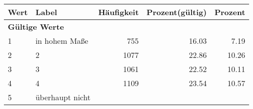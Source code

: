      \begin{longtable}{lXrrr}
     \toprule
     \textbf{Wert} & \textbf{Label} & \textbf{Häufigkeit} & \textbf{Prozent(gültig)} & \textbf{Prozent} \\
     \endhead
     \midrule
     \multicolumn{5}{l}{\textbf{Gültige Werte}}\\

     1 &
     \multicolumn{1}{X}{ in hohem Maße   } &


       \num{755} &
       \num[round-mode=places,round-precision=2]{16,03} &
         \num[round-mode=places,round-precision=2]{7,19} \\

     2 &
     \multicolumn{1}{X}{ 2   } &


       \num{1077} &
       \num[round-mode=places,round-precision=2]{22,86} &
         \num[round-mode=places,round-precision=2]{10,26} \\

     3 &
     \multicolumn{1}{X}{ 3   } &


       \num{1061} &
       \num[round-mode=places,round-precision=2]{22,52} &
         \num[round-mode=places,round-precision=2]{10,11} \\

     4 &
     \multicolumn{1}{X}{ 4   } &


       \num{1109} &
       \num[round-mode=places,round-precision=2]{23,54} &
         \num[round-mode=places,round-precision=2]{10,57} \\

     5 &
     \multicolumn{1}{X}{ überhaupt nicht   } &



\end{longtable}
